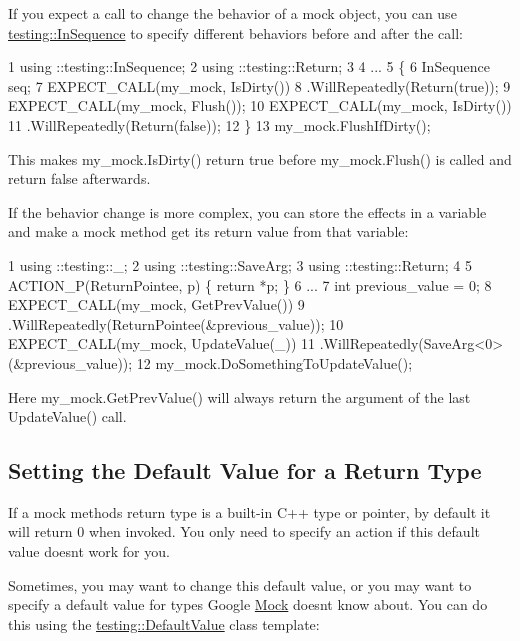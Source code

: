 If you expect a call to change the behavior of a mock object, you can use {\ttfamily \hyperlink{classtesting_1_1_in_sequence}{testing\+::\+In\+Sequence}} to specify different behaviors before and after the call\+:


\begin{DoxyCode}
1 using ::testing::InSequence;
2 using ::testing::Return;
3 
4 ...
5   \{
6     InSequence seq;
7     EXPECT\_CALL(my\_mock, IsDirty())
8         .WillRepeatedly(Return(true));
9     EXPECT\_CALL(my\_mock, Flush());
10     EXPECT\_CALL(my\_mock, IsDirty())
11         .WillRepeatedly(Return(false));
12   \}
13   my\_mock.FlushIfDirty();
\end{DoxyCode}


This makes {\ttfamily my\+\_\+mock.\+Is\+Dirty()} return {\ttfamily true} before {\ttfamily my\+\_\+mock.\+Flush()} is called and return {\ttfamily false} afterwards.

If the behavior change is more complex, you can store the effects in a variable and make a mock method get its return value from that variable\+:


\begin{DoxyCode}
1 using ::testing::\_;
2 using ::testing::SaveArg;
3 using ::testing::Return;
4 
5 ACTION\_P(ReturnPointee, p) \{ return *p; \}
6 ...
7   int previous\_value = 0;
8   EXPECT\_CALL(my\_mock, GetPrevValue())
9       .WillRepeatedly(ReturnPointee(&previous\_value));
10   EXPECT\_CALL(my\_mock, UpdateValue(\_))
11       .WillRepeatedly(SaveArg<0>(&previous\_value));
12   my\_mock.DoSomethingToUpdateValue();
\end{DoxyCode}


Here {\ttfamily my\+\_\+mock.\+Get\+Prev\+Value()} will always return the argument of the last {\ttfamily Update\+Value()} call.

\subsection*{Setting the Default Value for a Return Type}

If a mock method\textquotesingle{}s return type is a built-\/in C++ type or pointer, by default it will return 0 when invoked. You only need to specify an action if this default value doesn\textquotesingle{}t work for you.

Sometimes, you may want to change this default value, or you may want to specify a default value for types Google \hyperlink{class_mock}{Mock} doesn\textquotesingle{}t know about. You can do this using the {\ttfamily \hyperlink{classtesting_1_1_default_value}{testing\+::\+Default\+Value}} class template\+:


